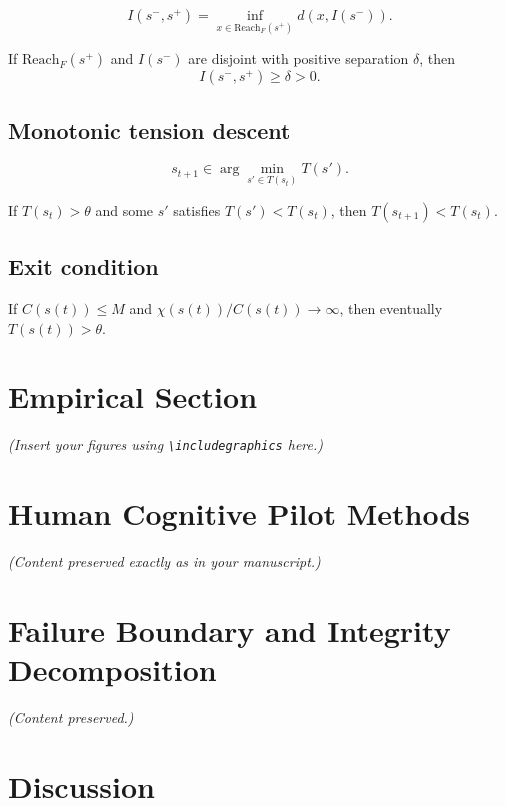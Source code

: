 \documentclass[12pt]{article}
\begin{document}
\begin{definition}
\[
I(s^-, s^+) = \inf_{x \in \text{Reach}_F(s^+)} d(x, I(s^-)).
\]
\end{definition}

\begin{proposition}
If $\text{Reach}_F(s^+)$ and $I(s^-)$ are disjoint with positive separation $\delta$, then
\[
I(s^-, s^+) \ge \delta > 0.
\]
\end{proposition}

\subsection{Monotonic tension descent}

\[
s_{t+1} \in \arg\min_{s' \in T(s_t)} T(s').
\]

\begin{proposition}
If $T(s_t) > \theta$ and some $s'$ satisfies $T(s') < T(s_t)$, then $T(s_{t+1}) < T(s_t)$.
\end{proposition}

\subsection{Exit condition}

If $C(s(t)) \le M$ and $\chi(s(t))/C(s(t)) \to \infty$, then eventually $T(s(t)) > \theta$.

\section{Empirical Section}

\textit{(Insert your figures using \texttt{\textbackslash includegraphics} here.)}

\section{Human Cognitive Pilot Methods}

\textit{(Content preserved exactly as in your manuscript.)}

\section{Failure Boundary and Integrity Decomposition}

\textit{(Content preserved.)}

\section{Discussion}
\end{document}
